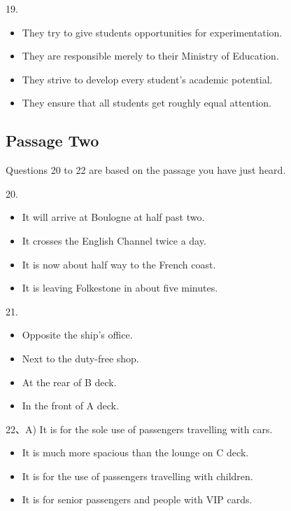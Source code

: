 \documentclass[UTF8,11pt]{ctexart}
\begin{document}
19.


\begin{itemize}[leftmargin=2em,itemsep=.2em,topsep=.4em]\item[A.] They try to give students opportunities for experimentation.
\item[B.] They are responsible merely to their Ministry of Education.
\item[C.] They strive to develop every student’s academic potential.
\item[D.] They ensure that all students get roughly equal attention.
\end{itemize}

\subsection*{Passage Two}


Questions 20 to 22 are based on the passage you have just heard.


20.


\begin{itemize}[leftmargin=2em,itemsep=.2em,topsep=.4em]\item[A.] It will arrive at Boulogne at half past two.
\item[B.] It crosses the English Channel twice a day.
\item[C.] It is now about half way to the French coast.
\item[D.] It is leaving Folkestone in about five minutes.
\end{itemize}

21.


\begin{itemize}[leftmargin=2em,itemsep=.2em,topsep=.4em]\item[A.] Opposite the ship’s office.
\item[B.] Next to the duty-free shop.
\item[C.] At the rear of B deck.
\item[D.] In the front of A deck.
\end{itemize}

22、A) It is for the sole use of passengers travelling with cars.


\begin{itemize}[leftmargin=2em,itemsep=.2em,topsep=.4em]\item[B.] It is much more spacious than the lounge on C deck.
\item[C.] It is for the use of passengers travelling with children.
\item[D.] It is for senior passengers and people with VIP cards.
\end{itemize}
\end{document}
